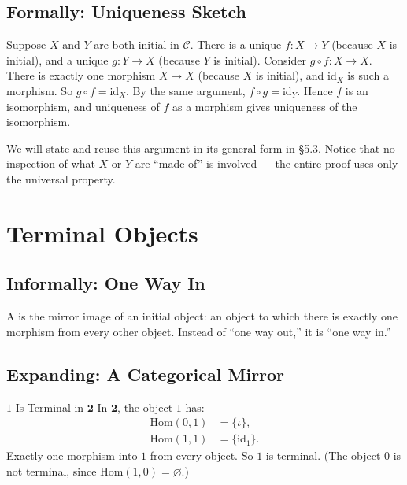 \subsection{Formally: Uniqueness Sketch}

Suppose $X$ and $Y$ are both initial in $\mathcal{C}$. There is a unique
$f : X \to Y$ (because $X$ is initial), and a unique $g : Y \to X$ (because
$Y$ is initial). Consider $g \circ f : X \to X$. There is exactly one
morphism $X \to X$ (because $X$ is initial), and $\mathrm{id}_X$ is such a
morphism. So $g \circ f = \mathrm{id}_X$. By the same argument,
$f \circ g = \mathrm{id}_Y$. Hence $f$ is an isomorphism, and uniqueness of
$f$ as a morphism gives uniqueness of the isomorphism.

We will state and reuse this argument in its general form in
\S5.3. Notice that no inspection of what $X$ or $Y$ are ``made of'' is
involved --- the entire proof uses only the universal property.


\section{Terminal Objects}
\label{sec:terminal}

\subsection{Informally: One Way In}

A  is the mirror image of an initial object: an object
to which there is exactly one morphism from every other object. Instead of
``one way out,'' it is ``one way in.''

\subsection{Expanding: A Categorical Mirror}

\begin{example}{$1$ Is Terminal in $\mathbf{2}$}
In $\mathbf{2}$, the object $1$ has:
\begin{align*}
  \mathrm{Hom}(0, 1) &= \{\iota\}, \\
  \mathrm{Hom}(1, 1) &= \{\mathrm{id}_1\}.
\end{align*}
Exactly one morphism into $1$ from every object. So $1$ is terminal. (The
object $0$ is not terminal, since $\mathrm{Hom}(1, 0) = \varnothing$.)
\end{example}

